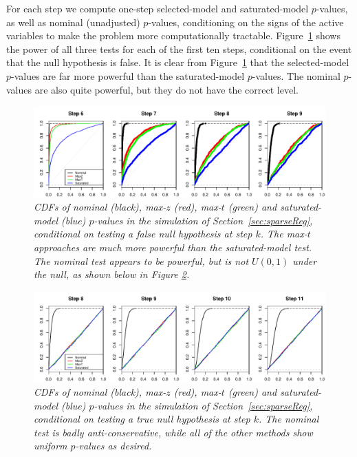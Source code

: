 \documentclass{article}
\begin{document}
For each step we compute one-step selected-model and saturated-model $p$-values, as well as nominal (unadjusted) $p$-values, conditioning on the signs of the active variables to make the problem more computationally tractable. Figure~\ref{fig:simulation_null_false} shows the power of all three tests for each of the first ten steps, conditional on the event that the null hypothesis is false. It is clear from Figure~\ref{fig:simulation_null_false} that the selected-model $p$-values are far more powerful than the saturated-model $p$-values. The nominal $p$-values are also quite powerful, but they do not have the correct level.

\begin{figure}[h]
  \centering
  \includegraphics[width=1\textwidth]{figs/simulation_snr_5_alpha_05_null_false.pdf}
  \caption{\em  CDFs of nominal (black), max-$z$ (red), max-$t$ (green) and  saturated-model (blue) $p$-values in the simulation of Section~\ref{sec:sparseReg}, conditional on testing a false null hypothesis at step $k$. The max-$t$ approaches are much more powerful than the saturated-model test. The nominal test appears to be powerful, 
  but is not $U(0,1)$ under the null, as shown below in Figure \ref{fig:simulation_null_true}.}
  \label{fig:simulation_null_false}
\end{figure}

\begin{figure}[h]
  \centering
  \includegraphics[width=1\textwidth]{figs/simulation_snr_5_alpha_05_null_true.pdf}
  \caption{\em  CDFs of nominal (black), max-$z$ (red), max-$t$ (green) and  saturated-model (blue) $p$-values in the simulation of Section~\ref{sec:sparseReg}, conditional on testing a true null hypothesis at step $k$.  The nominal test is badly anti-conservative, while all of the other methods  show uniform $p$-values as desired.}
  \label{fig:simulation_null_true}
\end{figure}
\end{document}

